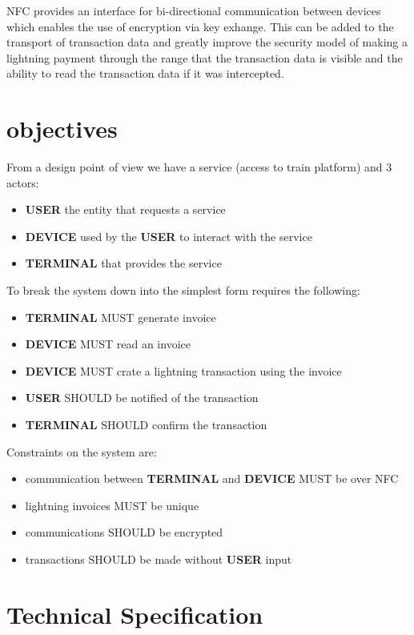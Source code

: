\documentclass[a4paper]{article}
\begin{document}
NFC provides an interface for bi-directional communication between devices which
enables the use of encryption via key exhange.  This can be added to the
transport of transaction data and greatly improve the security model of making a
lightning payment through the range that the transaction data is visible and the
ability to read the transaction data if it was intercepted.\\

\section{objectives}
From a design point of view we have a service (access to train platform) and 3
actors:
\begin{itemize}
    \item \textbf{USER} the entity that requests a service
    \item \textbf{DEVICE} used by the \textbf{USER} to interact with the service
    \item \textbf{TERMINAL} that provides the service
\end{itemize}

To break the system down into the simplest form requires the following:
\begin{itemize}
	\item \textbf{TERMINAL} MUST generate invoice
	\item \textbf{DEVICE} MUST read an invoice
	\item \textbf{DEVICE} MUST crate a lightning transaction using the invoice
	\item \textbf{USER} SHOULD be notified of the transaction
	\item \textbf{TERMINAL} SHOULD confirm the transaction
\end{itemize}

Constraints on the system are:
\begin{itemize}
    \item communication between \textbf{TERMINAL} and \textbf{DEVICE} MUST be over NFC
    \item lightning invoices MUST be unique
	\item communications SHOULD be encrypted
	\item transactions SHOULD be made without \textbf{USER} input
\end{itemize}

\section{Technical Specification}
\end{document}
